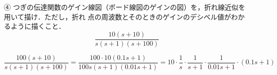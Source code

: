 ④ つぎの伝達関数のゲイン線図（ボード線図のゲインの図）を，折れ線近似を用いて描け．ただし，折れ
点の周波数とそのときのゲインのデシベル値がわかるように描くこと．
$$
\frac{10(s+10)}{s(s+1)(s+100)}
$$


$$
\frac{100(s+10)}{s(s+1)(s+100)}=\frac{100 \cdot 10(0.1 s+1)}{100 s(s+1)(0.01 s+1)}=10 \cdot \frac{1}{s} \cdot \frac{1}{s+1} \cdot \frac{1}{0.01 s+1} \cdot(0.1 s+1)
$$

\newpage

